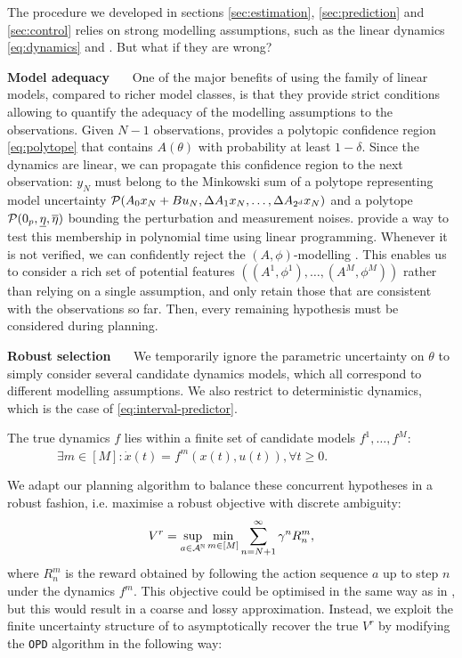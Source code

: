 \documentclass{article}
\begin{document}
The procedure we developed in sections \ref{sec:estimation}, \ref{sec:prediction} and \ref{sec:control} relies on strong modelling assumptions, such as the linear dynamics \eqref{eq:dynamics} and . But what if they are wrong?

\textbf{Model adequacy}~~~
One of the major benefits of using the family of linear models, compared to richer model classes, is that they provide strict conditions allowing to quantify the adequacy of the modelling assumptions to the observations.
Given $N-1$ observations,  provides a polytopic confidence region \eqref{eq:polytope} that contains $A(\theta)$ with probability at least $1-\delta$. Since the dynamics are linear, we can propagate this confidence region to the next observation: $y_{N}$ must belong to the Minkowski sum of a polytope representing model uncertainty $\mathcal{P}(A_{0} x_N + Bu_N, \Delta A_{1}x_N,\dots, \Delta A_{2^d}x_N)$ and a polytope $\mathcal{P}(0_p, \underline{\eta}, \overline{\eta})$ bounding the perturbation and measurement noises. \citet{delos2015} provide a way to test this membership in polynomial time using linear programming. Whenever it is not verified, we can confidently reject the $(A,\phi)$-modelling . This enables us to consider a rich set of potential features $\left((A^1, \phi^1), \dots, (A^M, \phi^M)\right)$ rather than relying on a single assumption, and only retain those that are consistent with the observations so far. Then, every remaining hypothesis must be considered during planning.

\textbf{Robust selection}~~~
We temporarily ignore the parametric uncertainty on $\theta$ to simply consider several candidate dynamics models, which all correspond to different modelling assumptions. We also restrict to deterministic dynamics, which is the case of \eqref{eq:interval-predictor}.

\begin{assumption}
\label{assumpt:multi-model-ambiguity}
The true dynamics $f$ lies within a finite set of candidate models $f^1, \dots, f^M$:
$
\qquad\qquad
\exists m\in[M]: \dot{x}(t) = f^m(x(t), u(t)), \forall t\geq 0.
$
\end{assumption}
We adapt our planning algorithm to balance these concurrent hypotheses in a robust fashion, i.e. maximise a robust objective with discrete ambiguity:
\begin{equation}
\label{eq:robust-objective-discrete}
V^r = \sup_{a\in\mathcal{A}^{\mathbb{N}}}\min_{m\in[M]} \sum_{n=N+1}^\infty \gamma^n R_n^m, 
\end{equation}
where $R_n^m$ is the reward obtained by following the action sequence $a$ up to step $n$ under the dynamics $f^m$.
This objective could be optimised in the same way as in , but this would result in a coarse and lossy approximation. Instead, we exploit the finite uncertainty structure of  to asymptotically recover the true $V^r$ by modifying the \texttt{OPD} algorithm in the following way:
\end{document}
